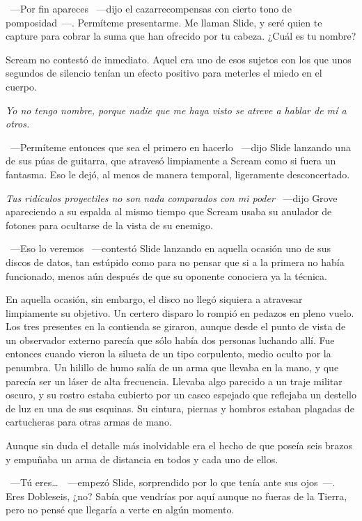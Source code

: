 ~---Por fin apareces ~---dijo el cazarrecompensas con cierto tono de pomposidad~---. Permíteme presentarme. Me llaman Slide, y seré quien te capture para cobrar la suma que han ofrecido por tu cabeza. ¿Cuál es tu nombre?

Scream no contestó de inmediato. Aquel era uno de esos sujetos con los que unos segundos de silencio tenían un efecto positivo para meterles el miedo en el cuerpo.

\emph{Yo no tengo nombre, porque nadie que me haya visto se atreve a hablar de mí a otros.}

~---Permíteme entonces que sea el primero en hacerlo ~---dijo Slide lanzando una de sus púas de guitarra, que atravesó limpiamente a Scream como si fuera un fantasma. Eso le dejó, al menos de manera temporal, ligeramente desconcertado.

\emph{Tus ridículos proyectiles no son nada comparados con mi poder} ~---dijo Grove apareciendo a su espalda al mismo tiempo que Scream usaba su anulador de fotones para ocultarse de la vista de su enemigo.

~---Eso lo veremos ~---contestó Slide lanzando en aquella ocasión uno de sus discos de datos, tan estúpido como para no pensar que si a la primera no había funcionado, menos aún después de que su oponente conociera ya la técnica.

En aquella ocasión, sin embargo, el disco no llegó siquiera a atravesar limpiamente su objetivo. Un certero disparo lo rompió en pedazos en pleno vuelo. Los tres presentes en la contienda se giraron, aunque desde el punto de vista de un observador externo parecía que sólo había dos personas luchando allí. Fue entonces cuando vieron la silueta de un tipo corpulento, medio oculto por la penumbra. Un hilillo de humo salía de un arma que llevaba en la mano, y que parecía ser un láser de alta frecuencia. Llevaba algo parecido a un traje militar oscuro, y su rostro estaba cubierto por un casco espejado que reflejaba un destello de luz en una de sus esquinas. Su cintura, piernas y hombros estaban plagadas de cartucheras para otras armas de mano.

Aunque sin duda el detalle más inolvidable era el hecho de que poseía seis brazos y empuñaba un arma de distancia en todos y cada uno de ellos.

~---Tú eres\dots\ ~---empezó Slide, sorprendido por lo que tenía ante sus ojos~---. Eres Dobleseis, ¿no? Sabía que vendrías por aquí aunque no fueras de la Tierra, pero no pensé que llegaría a verte en algún momento.

